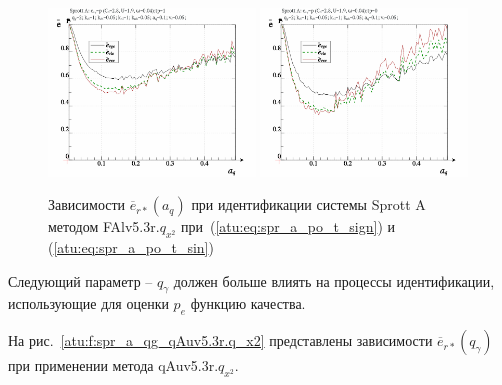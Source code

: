 \begin{figure}[h!]
  \centerline{
    \includegraphics[width=0.49\textwidth]{p/cha/spr_a/FAlv5.3A/sprott_a_FAlv5x3r-p_a_q_e_sign.png}
    \hfill
    \includegraphics[width=0.49\textwidth]{p/cha/spr_a/FAlv5.3A/sprott_a_FAlv5x3r-p_a_q_e_sin.png}
  }
  \caption{Зависимости $\overline{e}_{r*}(a_q)$ при идентификации системы Sprott A методом FAlv5.3r.$q_{x^2}$
   при~(\ref{atu:eq:spr_a_po_t_sign}) и (\ref{atu:eq:spr_a_po_t_sin})}
  \label{atu:f:spr_a_a_q_FAlv5.3r.q_x2}
\end{figure}

Следующий параметр -- $q_\gamma$ должен больше влиять на процессы идентификации,
использующие для оценки $p_e$ функцию качества.

На рис.~\ref{atu:f:spr_a_qg_qAuv5.3r.q_x2} представлены зависимости
$\overline{e}_{r*}(q_\gamma)$ при применении метода qAuv5.3r.$q_{x^2}$.

